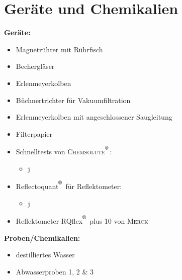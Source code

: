 \chapter{Geräte und Chemikalien}
\label{sec:geraete}

\textbf{Geräte:}
\begin{itemize}
	\item Magnetrührer mit Rührfisch
	\item Bechergläser
	\item Erlenmeyerkolben
	\item Büchnertrichter für Vakuumfiltration
	\item Erlenmeyerkolben mit angeschlossener Saugleitung
	\item Filterpapier
	\item Schnelltests von \textsc{Chemsolute$^{\textsuperscript{\textregistered}}$}:
		\begin{itemize}
			\item j
		\end{itemize}
	\item Reflectoquant$^{\textsuperscript{\textregistered}}$ für Reflektometer:
		\begin{itemize}
			\item j
		\end{itemize}
	\item Reflektometer RQflex$^{\textsuperscript{\textregistered}}$ plus 10 von \textsc{Merck}
\end{itemize}

\vspace*{5mm}

\textbf{Proben/Chemikalien:}
\begin{itemize}
	\item destilliertes Wasser
	\item Abwasserproben 1, 2 \& 3
\end{itemize}





